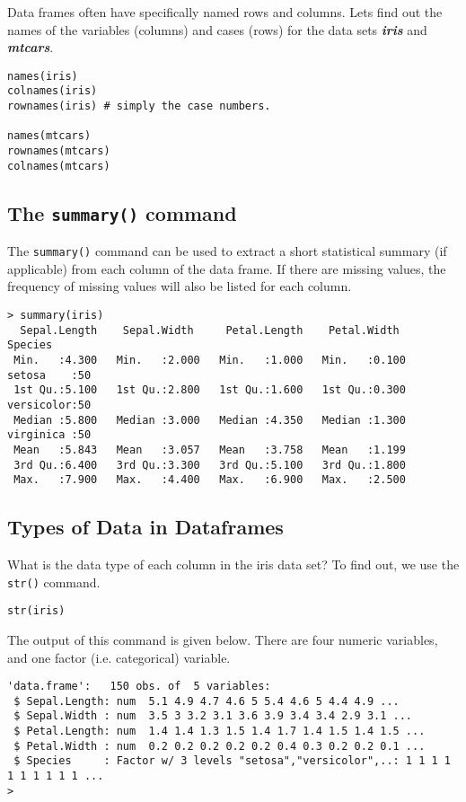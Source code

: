 \documentclass[a4paper,12pt]{article}
\begin{document}
Data frames often have specifically named rows and columns. Lets find out the names of the variables (columns) and cases (rows) for the data sets \textit{\textbf{iris}} and \textit{\textbf{mtcars}}.

\begin{framed}
\begin{verbatim}
names(iris)
colnames(iris)
rownames(iris) # simply the case numbers.

names(mtcars)
rownames(mtcars)
colnames(mtcars)
\end{verbatim}
\end{framed}

\subsection{The \texttt{summary()} command}
The \texttt{summary()} command can be used to extract a short statistical summary (if applicable) from each column of the data frame. 
If there are missing values, the frequency of missing values will also be listed for each column.

\begin{verbatim}
> summary(iris)
  Sepal.Length    Sepal.Width     Petal.Length    Petal.Width          Species  
 Min.   :4.300   Min.   :2.000   Min.   :1.000   Min.   :0.100   setosa    :50  
 1st Qu.:5.100   1st Qu.:2.800   1st Qu.:1.600   1st Qu.:0.300   versicolor:50  
 Median :5.800   Median :3.000   Median :4.350   Median :1.300   virginica :50  
 Mean   :5.843   Mean   :3.057   Mean   :3.758   Mean   :1.199                  
 3rd Qu.:6.400   3rd Qu.:3.300   3rd Qu.:5.100   3rd Qu.:1.800                  
 Max.   :7.900   Max.   :4.400   Max.   :6.900   Max.   :2.500                
\end{verbatim}

\subsection{Types of Data in Dataframes}
What is the data type of each column in the iris data set? To find out, we use the \texttt{str()} command.

\begin{framed}
\begin{verbatim}
str(iris)
\end{verbatim}
\end{framed}
The output of this command is given below. There are four numeric variables, and one factor (i.e. categorical) variable.
\begin{verbatim}
'data.frame':   150 obs. of  5 variables:
 $ Sepal.Length: num  5.1 4.9 4.7 4.6 5 5.4 4.6 5 4.4 4.9 ...
 $ Sepal.Width : num  3.5 3 3.2 3.1 3.6 3.9 3.4 3.4 2.9 3.1 ...
 $ Petal.Length: num  1.4 1.4 1.3 1.5 1.4 1.7 1.4 1.5 1.4 1.5 ...
 $ Petal.Width : num  0.2 0.2 0.2 0.2 0.2 0.4 0.3 0.2 0.2 0.1 ...
 $ Species     : Factor w/ 3 levels "setosa","versicolor",..: 1 1 1 1 1 1 1 1 1 1 ...
> 
\end{verbatim}
\end{document}
